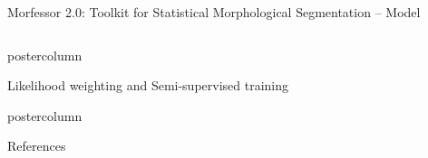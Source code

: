 \documentclass[final]{beamer} %
\begin{document}
\begin{frame}{Morfessor 2.0: Toolkit for Statistical Morphological Segmentation -- Model}
\begin{columns}
\begin{column}{.3\textwidth}
\begin{beamercolorbox}[center,wd=\textwidth]{postercolumn}
\begin{block}{Likelihood weighting and Semi-supervised training }
            \end{block}
	\end{beamercolorbox}


  \begin{beamercolorbox}[center,wd=\textwidth]{postercolumn}
 \begin{block}{References}
\footnotesize

           
            \end{block}
            
	\end{beamercolorbox}




\end{column}

\end{columns}
 \end{frame}



  
\end{document}
